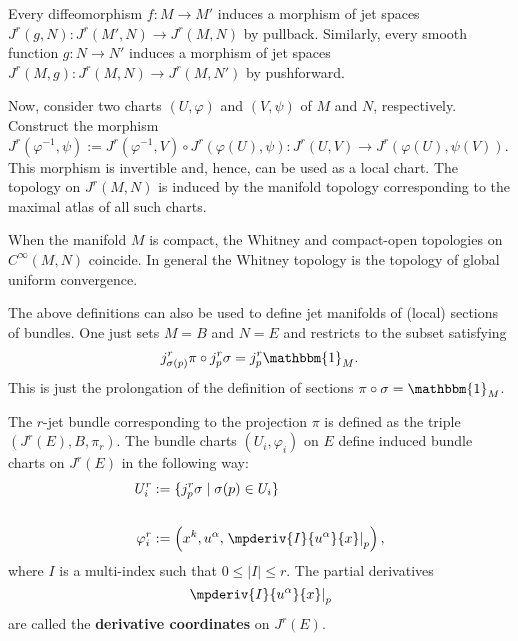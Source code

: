     \begin{property}[Topology]
        Every diffeomorphism $f:M\rightarrow M'$ induces a morphism of jet spaces $J^r(g,N):J^r(M',N)\rightarrow J^r(M,N)$ by pullback. Similarly, every smooth function $g:N\rightarrow N'$ induces a morphism of jet spaces $J^r(M,g):J^r(M,N)\rightarrow J^r(M,N')$ by pushforward.

        Now, consider two charts $(U,\varphi)$ and $(V,\psi)$ of $M$ and $N$, respectively. Construct the morphism $J^r(\varphi^{-1},\psi):=J^r(\varphi^{-1},V)\circ J^r(\varphi(U),\psi):J^r(U,V)\rightarrow J^r(\varphi(U),\psi(V))$. This morphism is invertible and, hence, can be used as a local chart. The topology on $J^r(M,N)$ is induced by the manifold topology corresponding to the maximal atlas of all such charts.
    \end{property}
    \begin{property}
        When the manifold $M$ is compact, the Whitney and compact-open topologies on $C^\infty(M,N)$ coincide. In general the Whitney topology is the topology of global uniform convergence.
    \end{property}

    \begin{remark}
        The above definitions can also be used to define jet manifolds of (local) sections of bundles. One just sets $M=B$ and $N=E$ and restricts to the subset satisfying
        \begin{gather}
            j^r_{\sigma(p)}\pi\circ j^r_p\sigma=j^r_p\mathbbm{1}_M.
        \end{gather}
        This is just the prolongation of the definition of sections $\pi\circ\sigma=\mathbbm{1}_M$.

        The $r$-jet bundle corresponding to the projection $\pi$ is defined as the triple $(J^r(E),B,\pi_r)$. The bundle charts $(U_i,\varphi_i)$ on $E$ define induced bundle charts on $J^r(E)$ in the following way:
        \begin{align}
            U_i^r &:= \{j_p^r\sigma\mid\sigma(p)\in U_i\}\\\nonumber\\
            \varphi_i^r &:= \left(x^k,u^\alpha,\left.\mpderiv{I}{u^\alpha}{x}\right|_p\right),
        \end{align}
        where $I$ is a multi-index such that $0\leq|I|\leq r$. The partial derivatives \[\left.\mpderiv{I}{u^\alpha}{x}\right|_p\] are called the \textbf{derivative coordinates} on $J^r(E)$.
    \end{remark}

